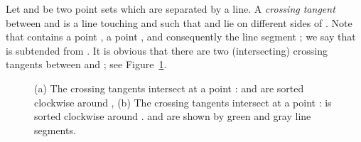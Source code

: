 \documentclass[11pt,a4paper]{article}
\newcommand{\CH}[1]{\text{}}
\begin{document}
Let  and  be two point sets which are separated by a line. A {\em crossing tangent} between  and  is a line  touching \CH{R} and \CH{B} such that  and  lie on different sides of . Note that  contains a point , a point , and consequently the line segment ; we say that  is subtended from . It is obvious that there are two (intersecting) crossing tangents between  and ; see Figure~\ref{three-matching-fig}. 

\begin{figure}[htb]
  \centering
\setlength{\tabcolsep}{0in}
  
  \caption{(a) The crossing tangents intersect at a point :  and  are sorted clockwise around , (b) The crossing tangents intersect at a point :  is sorted clockwise around .  and  are shown by green and gray line segments.}
\label{three-matching-fig}
\end{figure}
\end{document}
